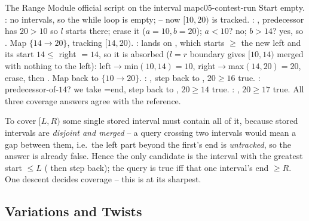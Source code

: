 \begin{example}{The Range Module official script on the interval map}{c05-contest-run}
Start empty. \emph{}: no intervals, so the while loop is empty; 
-- now $[10,20)$ is tracked. \emph{}: , predecessor
 has $20>10$ so $l$ starts there; erase it ($a{=}10,b{=}20$); $a<10$? no; $b>14$? yes, so
. Map $\{14\!\to\!20\}$, tracking $[14,20)$. \emph{}:
 lands on , which starts $\ge$ the new left and its start $14\le$
right $=14$, so it is absorbed ($l{=}r$ boundary gives $[10,14)$ merged with nothing to the left):
left$\to$min$(10,14){=}10$, right$\to$max$(14,20){=}20$, erase, then . Map back to
$\{10\!\to\!20\}$. \emph{}: , step back to
, $20\ge16$ \checkmark true. \emph{}: predecessor-of-$14$? we take
=end, step back to , $20\ge14$ true. \emph{}:
, $20\ge17$ true. All three coverage answers agree with the reference. \checkmark
\end{example}
\begin{tracebox}
To cover $[L,R)$ some single stored interval must contain all of it, because stored intervals are
\emph{disjoint and merged} -- a query crossing two intervals would mean a gap between them, i.e.\ the
left part beyond the first's end is \emph{untracked}, so the answer is already false. Hence the only
candidate is the interval with the greatest start $\le L$ ( then step back);
the query is true iff that one interval's end $\ge R$. One descent decides coverage -- this is
 at its sharpest.
\end{tracebox}

\subsection{Variations and Twists}

